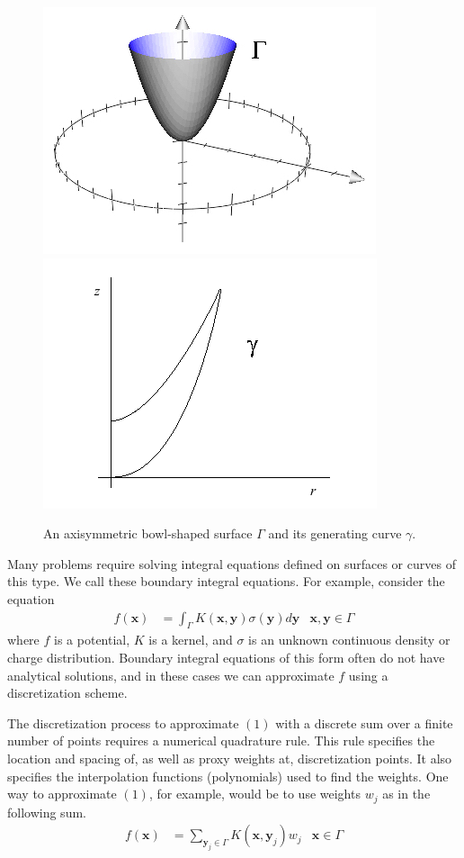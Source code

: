 \documentclass[11pt, oneside]{article}   	%
\begin{document}
\begin{figure}[h]
\caption{An axisymmetric bowl-shaped surface $\Gamma$ and its generating curve $\gamma$.}
\label{fig:1}
\centering
\includegraphics[scale=0.5]{./images/bowl3}
\includegraphics[scale=0.5]{./images/bowl}
\end{figure}

Many problems require solving integral equations defined on surfaces or curves of this type. We call these boundary integral equations. For example, consider the equation
\begin{align}
f(\mathbf{x}) &= \int_\Gamma K(\mathbf{x},\mathbf{y})\sigma(\mathbf{y})d\mathbf{y} &\mathbf{x},\mathbf{y}\in\Gamma
\end{align}
where $f$ is a potential, $K$ is a kernel, and $\sigma$ is an unknown continuous density or charge distribution. Boundary integral equations of this form often do not have analytical solutions, and in these cases we can approximate $f$ using a discretization scheme.

The discretization process to approximate $(1)$ with a discrete sum over a finite number of points requires a numerical quadrature rule. This rule specifies the location and spacing of, as well as proxy weights at, discretization points. It also specifies the interpolation functions (polynomials) used to find the weights. One way to approximate $(1)$, for example, would be to use weights $w_j$ as in the following sum.
\begin{align}
f(\mathbf{x}) &= \sum_{\mathbf{y}_j\in\Gamma} K(\mathbf{x},\mathbf{y}_j)w_j &\mathbf{x}\in\Gamma
\end{align}
\end{document}
